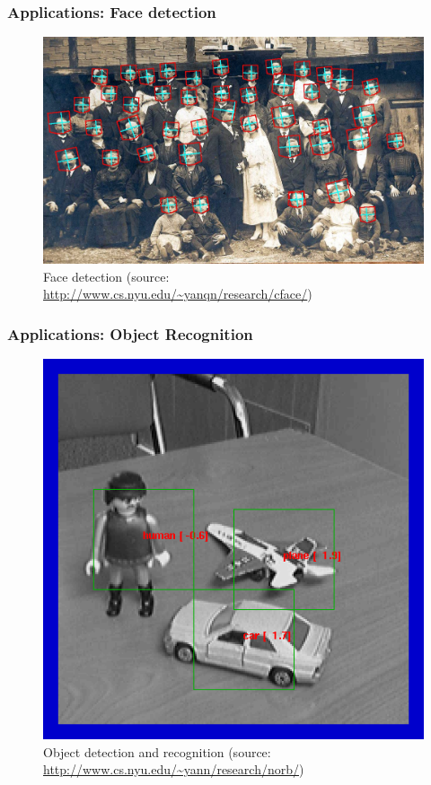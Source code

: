 \begin{frame}
  \frametitle{Applications: Face detection}
  \begin{figure}[h!]
    \centering
    \includegraphics[width=.8\textwidth]{graphics/facetest-alric.jpg}
    \caption{Face detection {\tiny (source:
        \url{http://www.cs.nyu.edu/~yanqn/research/cface/})}}
    \label{fig:lecunface}
  \end{figure}
\end{frame}

\begin{frame}
  \frametitle{Applications: Object Recognition}
  \begin{figure}[h!]
    \centering
    \includegraphics[height=.6\textheight]{graphics/norb.png}
    \caption{Object detection and recognition {\tiny (source:
        \url{http://www.cs.nyu.edu/~yann/research/norb/})}}
    \label{fig:lecunface}
  \end{figure}
\end{frame}

